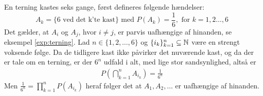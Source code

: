 \begin{exmp}\label{exmp:uafhængelighed}
En terning kastes seks gange, først defineres følgende hændelser: \begin{equation*} 
    A_k=\{6 \text{ ved det k'te kast}\} \text{ med } P(A_k)=\frac{1}{6}, \text{ for } k = 1,2\ldots,6 
\end{equation*} 
Det gælder, at $A_i$ og $A_j$, hvor  $i\neq j$, er parvis uafhængige af hinanden, se eksempel \ref{exp:terning}. Lad $n \in \{1, 2, \ldots, 6\}$ og $\{i_k\}_{k = 1}^n\subseteq \mathbb{N}$ være en strengt voksende følge.
Da de tidligere kast ikke påvirker det nuværende kast, og da der er tale om en terning, er der $6^n$ udfald i alt, med lige stor sandsynlighed, altså er
\begin{align*}
    P\left(\bigcap_{k=1}^n A_{i_k}\right)=\frac{1}{6^n}
\end{align*}
 Men $\frac{1}{6^n} = \prod_{k=1}^n P\left(A_{i_k}\right)$ heraf følger det at $A_1, A_2, \ldots$ er uafhængige af hinanden.
\end{exmp}
